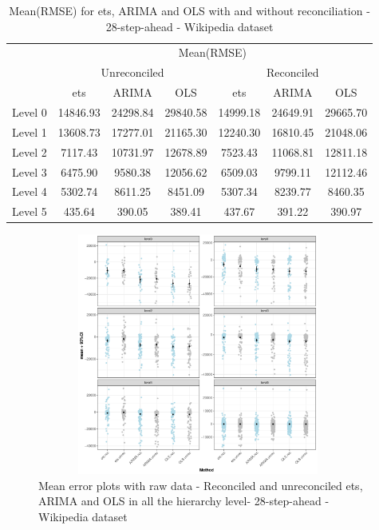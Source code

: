 \documentclass[11pt,a4paper,]{article}
\begin{document}
\begin{table}[t]

\caption{\label{tab:wikipediadataresultRMSE}Mean(RMSE) for ets, ARIMA and OLS with and without reconciliation - 28-step-ahead - Wikipedia dataset}
\centering
\begin{tabular}{ccccccc}
\toprule
\multicolumn{1}{c}{} & \multicolumn{6}{c}{Mean(RMSE)} \\
\cmidrule(l{2pt}r{2pt}){2-7}
\multicolumn{1}{c}{} & \multicolumn{3}{c}{Unreconciled} & \multicolumn{3}{c}{Reconciled} \\
\cmidrule(l{2pt}r{2pt}){2-4} \cmidrule(l{2pt}r{2pt}){5-7}
 & ets & ARIMA & OLS & ets & ARIMA & OLS\\
\midrule
Level 0 & 14846.93 & 24298.84 & 29840.58 & 14999.18 & 24649.91 & 29665.70\\
Level 1 & 13608.73 & 17277.01 & 21165.30 & 12240.30 & 16810.45 & 21048.06\\
Level 2 & 7117.43 & 10731.97 & 12678.89 & 7523.43 & 11068.81 & 12811.18\\
Level 3 & 6475.90 & 9580.38 & 12056.62 & 6509.03 & 9799.11 & 12112.46\\
Level 4 & 5302.74 & 8611.25 & 8451.09 & 5307.34 & 8239.77 & 8460.35\\
Level 5 & 435.64 & 390.05 & 389.41 & 437.67 & 391.22 & 390.97\\
\bottomrule
\end{tabular}
\end{table}

\begin{figure}

{\centering \includegraphics[width=400px,height=300px]{Paper-Figures/results_Wikipedia/boxplot_raw_data} 

}

\caption{Mean error plots with raw data -  Reconciled and unreconciled ets, ARIMA and OLS in all the hierarchy level- 28-step-ahead - Wikipedia dataset}\label{fig:errorplot28wiki}
\end{figure}
\end{document}
